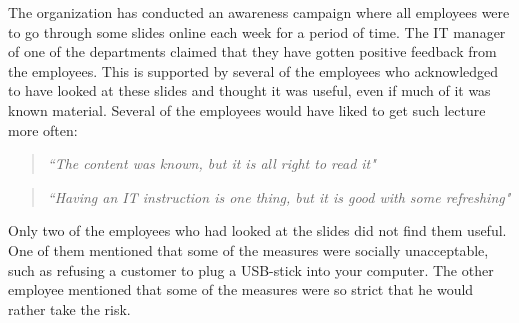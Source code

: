 The organization has conducted an awareness campaign where all employees were to go through some slides online each week for a period of time. The IT manager of one of the departments claimed that they have gotten positive feedback from the employees. This is supported by several of the employees who acknowledged to have looked at these slides and thought it was useful, even if much of it was known material. Several of the employees would have liked to get such lecture more often:

\begin{quote}
\textit{``The content was known, but it is all right to read it"}
\end{quote} 

\begin{quote}
\textit{``Having an IT instruction is one thing, but it is good with some refreshing"}
\end{quote}

Only two of the employees who had looked at the slides did not find them useful. One of them mentioned that some of the measures were socially unacceptable, such as refusing a customer to plug a USB-stick into your computer. The other employee mentioned that some of the measures were so strict that he would rather take the risk.